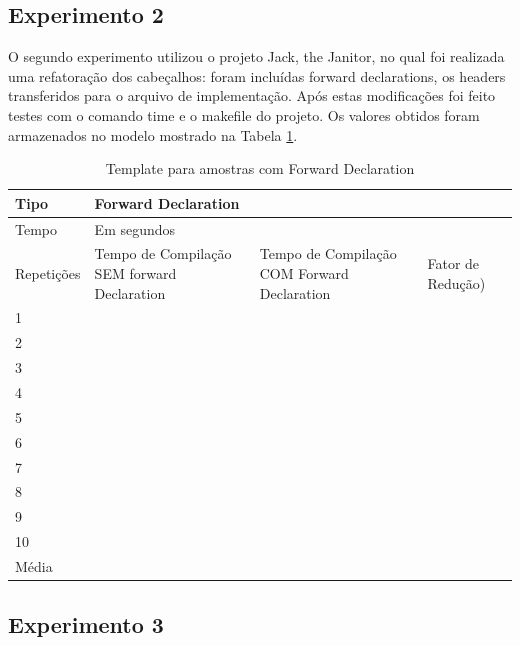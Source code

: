 \subsection{Experimento 2}

O segundo experimento utilizou o projeto Jack, the Janitor, no qual foi
 realizada uma refatoração dos cabeçalhos: foram incluídas forward
 declarations, os headers transferidos para o arquivo de
 implementação. Após estas modificações foi feito testes com o comando
 time e o makefile do projeto. Os valores obtidos foram armazenados no
 modelo mostrado na Tabela \ref{tab:modelo_forward_declaration}.

\begin{table}[h]
\centering
\begin{tabular}{|l|p{3cm}|p{3cm}|p{3cm}|}
\hline
Tipo       & \multicolumn{3}{l|}{Forward Declaration}                                                                                                                            \\ \hline
Tempo      & \multicolumn{3}{l|}{Em segundos}                                                                                                                                    \\ \hline
Repetições & Tempo de Compilação SEM forward Declaration & Tempo de Compilação COM Forward Declaration & Fator de Redução) \\ \hline
1 &  &  &  \\ \hline
2 &  &  &  \\ \hline
3 &  &  &  \\ \hline
4 &  &  &  \\ \hline
5 &  &  &  \\ \hline
6 &  &  &  \\ \hline
7 &  &  &  \\ \hline
8 &  &  &  \\ \hline
9 &  &  &  \\ \hline
10 &  &  &  \\ \hline
Média &  &  &  \\ \hline
\end{tabular}
\caption{Template para amostras com Forward Declaration}
\label{tab:modelo_forward_declaration}
\end{table}

\subsection{Experimento 3}\label{experimento_03}

